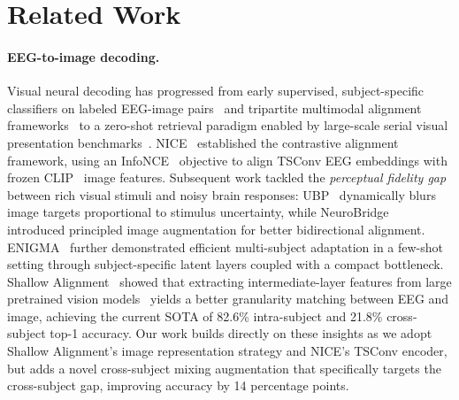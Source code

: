 \documentclass{article}
\begin{document}
\section{Related Work}
\label{sec:related}

\paragraph{EEG-to-image decoding.}
Visual neural decoding has progressed from early supervised, subject-specific classifiers on labeled
EEG-image pairs~\cite{spampinato2017deep} and tripartite multimodal alignment frameworks~\cite{du2023bravl} to a zero-shot retrieval paradigm enabled by large-scale serial visual presentation benchmarks~\cite{gifford2022things,grootswagers2022things}.
NICE~\cite{song2024nice} established the contrastive alignment framework, using an InfoNCE~\cite{oord2019cpc} objective to align TSConv EEG embeddings with frozen CLIP~\cite{radford2021clip} image features.
Subsequent work tackled the \emph{perceptual fidelity gap} between rich visual stimuli and noisy brain responses: UBP~\cite{wu2025ubp} dynamically blurs image targets proportional to stimulus uncertainty, while NeuroBridge~\cite{zhang2025neurobridge} introduced principled image augmentation for better bidirectional alignment.
ENIGMA~\cite{kneeland2025enigma} further demonstrated efficient multi-subject adaptation in a few-shot setting through
subject-specific latent layers coupled with a compact bottleneck.
Shallow Alignment~\cite{du2025shallow} showed that extracting intermediate-layer features from large pretrained vision models~\cite{chen2024internvl} yields a better granularity matching between EEG and image, achieving the current SOTA of 82.6\% intra-subject and 21.8\% cross-subject top-1 accuracy.
Our work builds directly on these insights as we adopt Shallow Alignment's image representation strategy
and NICE's TSConv encoder, but adds a novel cross-subject mixing augmentation that specifically targets the cross-subject gap, improving accuracy by 14 percentage points.
\end{document}
